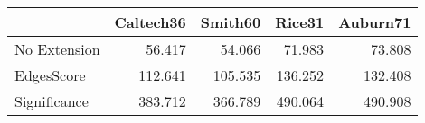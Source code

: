 \begin{tabular}{lrrrr}
\toprule
{} & Caltech36 & Smith60 &  Rice31 & Auburn71 \\
\midrule
No Extension &    56.417 &  54.066 &  71.983 &   73.808 \\
EdgesScore   &   112.641 & 105.535 & 136.252 &  132.408 \\
Significance &   383.712 & 366.789 & 490.064 &  490.908 \\
\bottomrule
\end{tabular}
